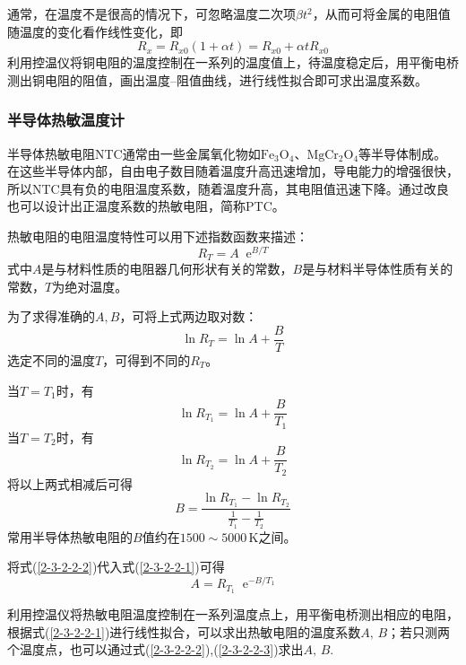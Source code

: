 \documentclass[UTF-8,twoside,cs4size]{ctexart}
\newcommand*{\me}{\mathop{}\!\mathrm{e}}
\begin{document}
	通常，在温度不是很高的情况下，可忽略温度二次项$ \beta t^2 $，从而可将金属的电阻值随温度的变化看作线性变化，即
	\[R_x=R_{x0}(1+\alpha t)=R_{x0}+\alpha tR_{x0}\]
	利用控温仪将铜电阻的温度控制在一系列的温度值上，待温度稳定后，用平衡电桥测出铜电阻的阻值，画出温度--阻值曲线，进行线性拟合即可求出温度系数。
	
	\subsubsection{半导体热敏温度计}
	半导体热敏电阻NTC通常由一些金属氧化物如$ \mathrm{Fe_3O_4} $、$ \mathrm{MgCr_2O_4} $等半导体制成。在这些半导体内部，自由电子数目随着温度升高迅速增加，导电能力的增强很快，所以NTC具有负的电阻温度系数，随着温度升高，其电阻值迅速下降。通过改良也可以设计出正温度系数的热敏电阻，简称PTC。
	
	热敏电阻的电阻温度特性可以用下述指数函数来描述：
	\[R_T=A\me^{B/T}\]
	式中$ A $是与材料性质的电阻器几何形状有关的常数，$ B $是与材料半导体性质有关的常数，$ T $为绝对温度。
	
	为了求得准确的$ A,B $，可将上式两边取对数：
	\begin{equation}\label{2-3-2-2-1}
		\ln R_T=\ln A+\frac BT
	\end{equation}
	选定不同的温度$ T $，可得到不同的$ R_T $。
	
	当$ T=T_1 $时，有
	\[\ln R_{T_1}=\ln A+\frac{B}{T_1}\]
	当$ T=T_2 $时，有
	\[\ln R_{T_2}=\ln A+\frac{B}{T_2}\]
	将以上两式相减后可得
	\begin{equation}\label{2-3-2-2-2}
		B=\frac{\ln R_{T_1}-\ln R_{T_2}}{\frac{1}{T_1}-\frac{1}{T_2}}
	\end{equation}
	常用半导体热敏电阻的$ B $值约在$ 1500\sim 5000\,\mathrm K $之间。

	将式(\ref{2-3-2-2-2})代入式(\ref{2-3-2-2-1})可得
	\begin{equation}\label{2-3-2-2-3}
		A=R_{T_1}\me^{-B/T_1}
	\end{equation}
	
	利用控温仪将热敏电阻温度控制在一系列温度点上，用平衡电桥测出相应的电阻，根据式(\ref{2-3-2-2-1})进行线性拟合，可以求出热敏电阻的温度系数$ A,\,B $；若只测两个温度点，也可以通过式(\ref{2-3-2-2-2}),(\ref{2-3-2-2-3})求出$ A,\,B $.
	
\end{document}
